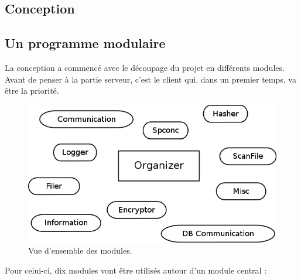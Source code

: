 \documentclass[a4paper,10pt, twoside]{report}
\begin{document}
\begin{spacing}{1.2}
\section{Conception}
\subsection{Un programme modulaire}

La conception a commencé avec le découpage du projet en différents
modules. Avant de penser à la partie serveur, c'est le client qui, dans un
premier temps, va être la priorité.

\begin{figure}[h!]
  \centering
  \includegraphics[scale=0.51]{softwareDesign/overviewModule.png}
  \caption{\label{overviewModule} Vue d'ensemble des modules.}
\end{figure}

Pour celui-ci, dix modules vont être utilisés autour d'un module central :


\end{spacing}
\end{document}
